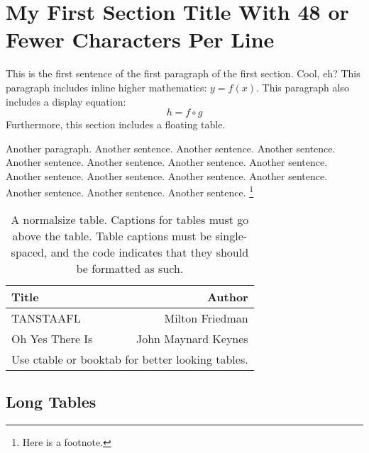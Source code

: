 \documentclass[12pt,econ]{sources/authesis}
\theoremstyle{definition}
\theoremstyle{definition}
\theoremstyle{definition}
\theoremstyle{remark}
\begin{document}
\section{\texorpdfstring{My First Section Title \newline With 48 or
Fewer Characters Per
Line}{My First Section Title With 48 or Fewer Characters Per Line}}\label{my-first-section-title-with-48-or-fewer-characters-per-line}

This is the first sentence of the first paragraph of the first section.
Cool, eh? This paragraph includes inline higher mathematics: \(y=f(x)\).
This paragraph also includes a display equation:
\begin{equation}
h = f \circ g
\end{equation}
Furthermore, this section includes a floating table.

Another paragraph. Another sentence. Another sentence. Another sentence.
Another sentence. Another sentence. Another sentence. Another sentence.
Another sentence. Another sentence. Another sentence. Another sentence.
Another sentence. Another sentence. Another sentence. \footnote{
Here is a footnote.}
\begin{table}[ht]\centering
\caption{A normalsize table.
Captions for tables must go above the table.
Table captions must be single-spaced,
and the code indicates that they should be formatted as such.}
\begin{tabular}{lr}\hline\hline
Title & Author \\ \hline
TANSTAAFL & Milton Friedman \\
Oh Yes There Is & John Maynard Keynes \\ \hline
\multicolumn{2}{c}{\small Use ctable or booktab for better looking tables.}
\end{tabular}
\end{table}
\subsection{Long Tables}\label{long-tables}
\end{document}
